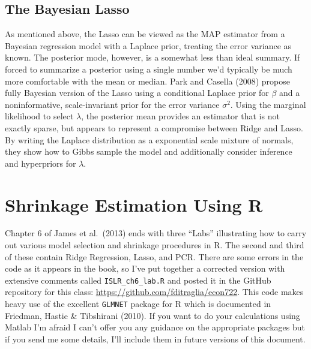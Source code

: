 



\subsection{The Bayesian Lasso}
As mentioned above, the Lasso can be viewed as the MAP estimator from a Bayesian regression model with a Laplace prior, treating the error variance as known. The posterior mode, however, is a somewhat less than ideal summary. If forced to summarize a posterior using a single number we'd typically be much more comfortable with the mean or median. Park and Casella (2008) propose fully Bayesian version of the Lasso using a conditional Laplace prior for $\beta$ and a noninformative, scale-invariant prior for the error variance $\sigma^2$. Using the marginal likelihood to select $\lambda$, the posterior mean provides an estimator that is not exactly sparse, but appears to represent a compromise between Ridge and Lasso. By writing the Laplace distribution as a exponential scale mixture of normals, they show how to Gibbs sample the model and additionally consider inference and hyperpriors for $\lambda$.


\section{Shrinkage Estimation Using R}
Chapter 6 of James et al.\ (2013) ends with three ``Labs'' illustrating how to carry out various model selection and shrinkage procedures in R. The second and third of these contain Ridge Regression, Lasso, and PCR. There are some errors in the code as it appears in the book, so I've put together a corrected version with extensive comments called \texttt{ISLR\_ch6\_lab.R} and posted it in the GitHub repository for this class: \url{https://github.com/fditraglia/econ722}. This code makes heavy use of the excellent \texttt{GLMNET} package for R which is documented in Friedman, Hastie \& Tibshirani (2010). If you want to do your calculations using Matlab I'm afraid I can't offer you any guidance on the appropriate packages but if you send me some details, I'll include them in future versions of this document.

